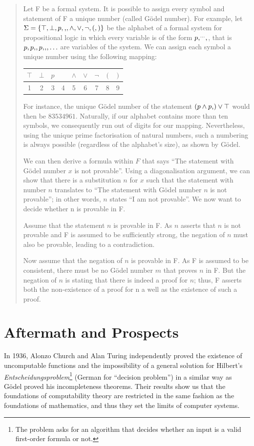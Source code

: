 \documentclass{article}
\newcommand*\vtick{\textsc{\char13}}
\begin{document}
\begin{quote}
Let F be a formal system. It is possible to assign every symbol and statement of F a unique number (called Gödel number). For example, let $\Sigma=\{\top,\bot,p,\vtick,\land,\lor,\lnot,(,)\}$ be the alphabet of a formal system for propositional logic in which every variable is of the form $p\vtick^{\ldots}\vtick$, that is $p,p\vtick,p\vtick\vtick,\ldots$ are variables of the system. We can assign each symbol a unique number using the following mapping:

\begin{center}
\begin{tabular}{| c | c | c | c | c | c | c | c | c |}
\hline $\top$ & $\bot$ & $p$ & \vtick & $\land$ & $\lor$ & $\lnot$ & $($ & $)$ \\
\hline 1 & 2 & 3 & 4 & 5 & 6 & 7 & 8 & 9\\
\hline
\end{tabular}
\end{center}
For instance, the unique Gödel number of the statement $(p\land p\vtick)\lor \top$ would then be $83534961$. Naturally, if our alphabet contains more than ten symbols, we consequently run out of digits for our mapping. Nevertheless, using the unique prime factorisation of natural numbers, such a numbering is always possible (regardless of the alphabet's size), as shown by Gödel.\cite{goedel_incompleteness}

We can then derive a formula within $F$ that says ``The statement with Gödel number $x$ is not provable''. Using a diagonalisation argument, we can show that there is a substitution $n$ for $x$ such that the statement with number $n$ translates to ``The statement with Gödel number $n$ is not provable''; in other words, $n$ states ``I am not provable''. We now want to decide whether n is provable in F.

Assume that the statement $n$ is provable in F. As $n$ asserts that $n$ is not provable and F is assumed to be sufficiently strong, the negation of $n$ must also be provable, leading to a contradiction.

Now assume that the negation of $n$ is provable in F. As F is assumed to be consistent, there must be no Gödel number $m$ that proves $n$ in F. But the negation of $n$ is stating that there is indeed a proof for $n$; thus, F asserts both the non-existence of a proof for n a well as the existence of such a proof.
\end{quote}

\section{Aftermath and Prospects}
In 1936, Alonzo Church and Alan Turing independently proved the existence of uncomputable functions and the impossibility of a general solution for Hilbert's \textit{Entscheidungspro\-blem}\footnote{The problem asks for an algorithm that decides whether an input is a valid first-order formula or not.} (German for ``decision problem'') in a similar way as Gödel proved his incompleteness theorems. Their results show us that the foundations of computability theory are restricted in the same fashion as the foundations of mathematics, and thus they set the limits of computer systems.
\end{document}
